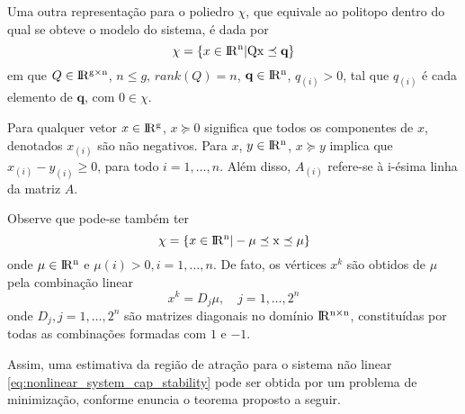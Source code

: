 Uma outra representação para o poliedro $\chi$, que equivale ao politopo dentro do qual se obteve o modelo do sistema, é dada por
\begin{equation}\label{eq:anothe_rep_of_chi}
\chi = \{x \in \rm I\!R^{n} | Qx \preceq \textbf{q}\}
\end{equation}
em que $Q\in\rm I\!R^{g\times n}$, $n\leq g$, $rank(Q) = n$, $\textbf{q} \in \rm I\!R^{n}$, $q_{(i)} > 0$, tal que $q_{(i)}$ é cada elemento de $\textbf{q}$, com $0 \in \chi$.
\begin{observation}
	Para qualquer vetor $x \in \rm I\!R^{g}$, $x \succeq 0$ significa que todos os componentes de $x$, denotados $x_{(i)}$ são não negativos. Para $x$, $y \in \rm I\!R^{n}$, $x \succeq y$ implica que $x_{(i)} - y_{(i)} \geq 0$, para todo $i = 1,\hdots, n$. Além disso, $A_{(i)}$ refere-se à i-ésima linha da matriz $A$.
	
	Observe que pode-se também ter
	\begin{equation}\label{eq:another_rep_of_chi}
	\chi = \{x \in \rm I\!R^{n} |-\mu\preceq x \preceq\mu\}
	\end{equation}
	onde $\mu \in \rm I\!R^{n}$ e $\mu{(i)} > 0, i = 1, \hdots,n$.
	De fato, os vértices $x^k$ são obtidos de $\mu$ pela combinação linear\cite{article:tarbouriech:2009}
	\begin{equation*}
	x^k = D_j\mu,\quad j =1,\hdots,2^n
	\end{equation*}
	onde $D_j, j = 1,\hdots,2^n$ são matrizes diagonais no domínio $\rm I\!R^{n \times n}$, constituídas por todas as combinações  formadas com $1$ e $-1$.
\end{observation}
Assim, uma estimativa da região de atração para o sistema não linear \ref{eq:nonlinear_system_cap_stability} pode ser obtida por um problema de minimização, conforme enuncia o teorema proposto a seguir.
